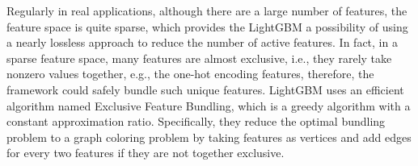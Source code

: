 Regularly in real applications, although there are a large number of features, the feature space is quite sparse, which provides the LightGBM a possibility of using a nearly lossless approach to reduce the number of active features.
In fact, in a sparse feature space, many features are almost exclusive, i.e., they rarely take nonzero values together, e.g., the one-hot encoding features, therefore, the framework could safely bundle such unique features.
LightGBM uses an efficient algorithm named Exclusive Feature Bundling, which is a greedy algorithm with a constant approximation ratio.
Specifically, they reduce the optimal bundling problem to a graph coloring problem by taking features as vertices and add edges for every two features if they are not together exclusive.
